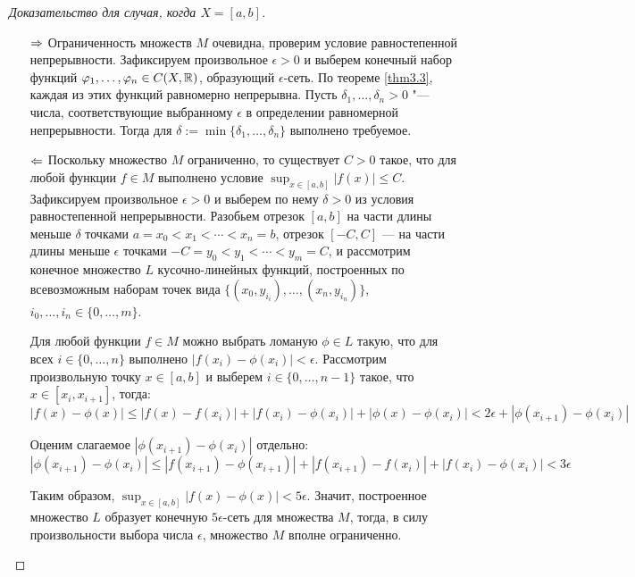\begin{proof}[Доказательство для случая, когда {$X = [a, b]$}]~
    \begin{itemize}
        \item[$\Rightarrow$] Ограниченность множеств $M$ очевидна, проверим условие равностепенной непрерывности. Зафиксируем произвольное $\epsilon > 0$ и выберем конечный набор функций $\varphi_1, \dotsc, \varphi_n \in C(X, \mathbb{R})$, образующий $\epsilon$-сеть. По теореме \ref{thm3.3}, каждая из этих функций равномерно непрерывна. Пусть $\delta_1, \dotsc, \delta_n > 0$ "--- числа, соответствующие выбранному $\epsilon$ в определении равномерной непрерывности. Тогда для $\delta := \min \{\delta_1, \dotsc, \delta_n\}$ выполнено требуемое.
        
        \item[$\Leftarrow$] Поскольку множество $M$ ограниченно, то существует $C > 0$ такое, что для любой функции $f \in M$ выполнено условие $\sup_{x \in [a, b]}|f(x)| \le C$. Зафиксируем произвольное $\epsilon > 0$ и выберем по нему $\delta > 0$ из условия равностепенной непрерывности. Разобьем отрезок $[a, b]$ на части длины меньше $\delta$ точками $a = x_0 < x_1 < \dotsb < x_n = b$, отрезок $[-C, C]$ --- на части длины меньше $\epsilon$ точками $-C = y_0 < y_1 < \dotsb < y_m = C$, и рассмотрим конечное множество $L$ кусочно-линейных функций, построенных по всевозможным наборам точек вида $\{(x_0, y_{i_i}), \dotsc, (x_n, y_{i_n})\}$, $i_0, \dotsc, i_n \in \{0, \dotsc, m\}$.
        
        Для любой функции $f \in M$ можно выбрать ломаную $\phi \in L$ такую, что для всех $i \in \{0, \dotsc, n\}$ выполнено $|f(x_i) - \phi(x_i)| < \epsilon$. Рассмотрим произвольную точку $x \in [a, b]$ и выберем $i \in \{0, \dotsc, n - 1\}$ такое, что $x \in [x_i, x_{i + 1}]$, тогда:
        \[
            |f(x) - \phi(x)| \le |f(x) - f(x_i)| + |f(x_i) - \phi(x_i)| + |\phi(x) - \phi(x_i)| <  2\epsilon + |\phi(x_{i+1}) - \phi(x_i)|
        \]

        Оценим слагаемое $|\phi(x_{i+1}) - \phi(x_i)|$ отдельно:
        \[|\phi(x_{i+1}) - \phi(x_i)| \le |f(x_{i+1}) - \phi(x_{i+1})| + |f(x_{i+1}) - f(x_i)| + |f(x_i) - \phi(x_i)| < 3\epsilon\]

        Таким образом, $\sup_{x \in [a, b]}|f(x) - \phi(x)| < 5\epsilon$. Значит, построенное множество $L$ образует конечную $5\epsilon$-сеть для множества $M$, тогда, в силу произвольности выбора числа $\epsilon$, множество $M$ вполне ограниченно.\qedhere
    \end{itemize}
\end{proof}